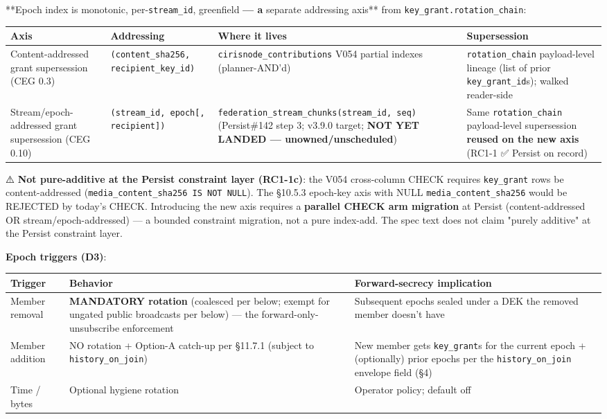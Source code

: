 \documentclass[10pt]{article}
\begin{document}
**Epoch index is monotonic, per-\texttt{stream\_id}, greenfield\textbf{ — a }separate addressing axis** from \texttt{key\_grant.rotation\_chain}:


{\scriptsize
\begin{longtable}{|p{4.0cm}|p{4.0cm}|p{4.0cm}|p{4.0cm}|}\hline
\textbf{Axis} & \textbf{Addressing} & \textbf{Where it lives} & \textbf{Supersession} \\ \hline\endhead
Content-addressed grant supersession (CEG 0.3) & \texttt{(content\_sha256, recipient\_key\_id)} & \texttt{cirisnode\_contributions} V054 partial indexes (planner-AND'd) & \texttt{rotation\_chain} payload-level lineage (list of prior \texttt{key\_grant\_id}s); walked reader-side \\ \hline
Stream/epoch-addressed grant supersession (CEG 0.10) & \texttt{(stream\_id, epoch[, recipient])} & \texttt{federation\_stream\_chunks(stream\_id, seq)} (Persist\#142 step 3; v3.9.0 target; \textbf{NOT YET LANDED — unowned/unscheduled}) & Same \texttt{rotation\_chain} payload-level supersession \textbf{reused on the new axis} (RC1-1 ✅ Persist on record) \\ \hline
\end{longtable}}


⚠️ \textbf{Not pure-additive at the Persist constraint layer (RC1-1c)}: the V054 cross-column CHECK requires \texttt{key\_grant} rows be content-addressed (\texttt{media\_content\_sha256 IS NOT NULL}). The §10.5.3 epoch-key axis with NULL \texttt{media\_content\_sha256} would be REJECTED by today's CHECK. Introducing the new axis requires a \textbf{parallel CHECK arm migration} at Persist (content-addressed OR stream/epoch-addressed) — a bounded constraint migration, not a pure index-add. The spec text does not claim "purely additive" at the Persist constraint layer.


\textbf{Epoch triggers (D3)}:


{\footnotesize
\begin{longtable}{|p{5.33cm}|p{5.33cm}|p{5.33cm}|}\hline
\textbf{Trigger} & \textbf{Behavior} & \textbf{Forward-secrecy implication} \\ \hline\endhead
Member removal & \textbf{MANDATORY rotation} (coalesced per below; exempt for ungated public broadcasts per below) — the forward-only-unsubscribe enforcement & Subsequent epochs sealed under a DEK the removed member doesn't have \\ \hline
Member addition & NO rotation + Option-A catch-up per §11.7.1 (subject to \texttt{history\_on\_join}) & New member gets \texttt{key\_grant}s for the current epoch + (optionally) prior epochs per the \texttt{history\_on\_join} envelope field (§4) \\ \hline
Time / bytes & Optional hygiene rotation & Operator policy; default off \\ \hline
\end{longtable}}
\end{document}
